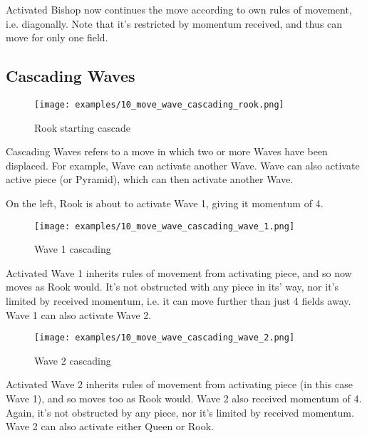 Activated Bishop now continues the move according to own rules of movement,
i.e. diagonally. Note that it's restricted by momentum received, and thus
can move for only one field.

\clearpage %

\subsection*{Cascading Waves}

\noindent
\begin{wrapfigure}[13]{l}{0.5625\textwidth}
\centering
\texttt{[image: examples/10\_move\_wave\_cascading\_rook.png]}
\caption{Rook starting cascade}
\label{fig:10_move_wave_cascading_rook}
\end{wrapfigure}
Cascading Waves refers to a move in which two or more Waves have been displaced.
For example, Wave can activate another Wave. Wave can also activate active
piece (or Pyramid), which can then activate another Wave.

On the left, Rook is about to activate Wave 1, giving it momentum of 4.

\vspace*{0.05\textheight}
\noindent
\begin{wrapfigure}[12]{r}{0.5625\textwidth}
\centering
\texttt{[image: examples/10\_move\_wave\_cascading\_wave\_1.png]}
\caption{Wave 1 cascading}
\label{fig:10_move_wave_cascading_wave_1}
\end{wrapfigure}
Activated Wave 1 inherits rules of movement from activating piece, and so now
moves as Rook would. It's not obstructed with any piece in its' way, nor it's
limited by received momentum, i.e. it can move further than just 4 fields away.
Wave 1 can also activate Wave 2.

\clearpage %

\noindent
\begin{wrapfigure}[13]{l}{0.5625\textwidth}
\centering
\texttt{[image: examples/10\_move\_wave\_cascading\_wave\_2.png]}
\caption{Wave 2 cascading}
\label{fig:10_move_wave_cascading_wave_2}
\end{wrapfigure}
Activated Wave 2 inherits rules of movement from activating piece (in this
case Wave 1), and so moves too as Rook would. Wave 2 also received momentum
of 4. Again, it's not obstructed by any piece, nor it's limited by received
momentum. Wave 2 can also activate either Queen or Rook.

